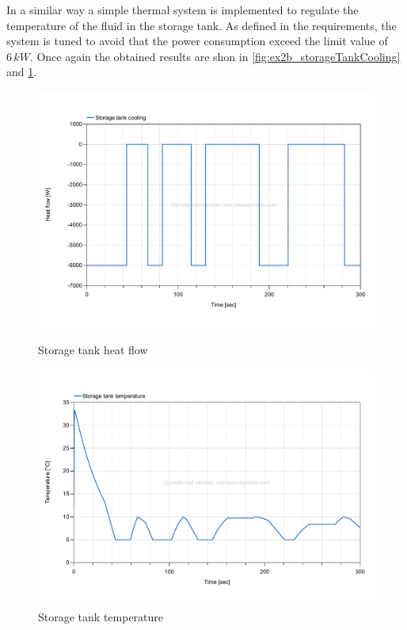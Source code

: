 \documentclass[11pt,a4paper,oneside]{article}
\begin{document}
In a similar way a simple thermal system is implemented to regulate the temperature of the fluid in the storage tank.
As defined in the requirements, the system is tuned to avoid that the power consumption exceed the limit value of $6\,kW$.
Once again the obtained results are shon in \cref{fig:ex2b_storageTankCooling} and \cref{fig:ex2b_storageTankTemp}.
\begin{figure}[H]
    \centering
    \begin{minipage}{0.45\textwidth}
        \centering
        \includegraphics*[width=\textwidth, keepaspectratio]{Figures/ex2b_storageTankCooling.pdf}
        \caption[]{\label{fig:ex2b_storageTankCooling} Storage tank heat flow}
    \end{minipage}
    \hspace{0.05\textwidth}
    \begin{minipage}{0.45\textwidth}
        \centering
        \includegraphics*[width=\textwidth, keepaspectratio]{Figures/ex2b_storageTankTemp.pdf}
        \caption[]{\label{fig:ex2b_storageTankTemp} Storage tank temperature}
    \end{minipage}
\end{figure}
\end{document}
